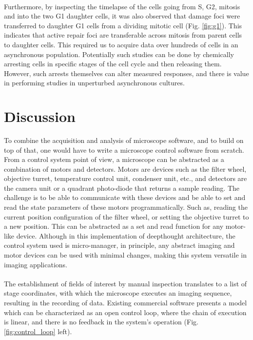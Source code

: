 \paragraph*{} Furthermore, by inspecting the timelapse of the cells going from S, G2, mitosis and into the two G1 daughter cells, it was also observed that damage foci were transferred to daughter G1 cells from a dividing mitotic cell (Fig. \ref{fig:g1}). This indicates that active repair foci are transferable across mitosis from parent cells to daughter cells. This required us to acquire data over hundreds of cells in an asynchronous population. Potentially such studies can be done by chemically arresting cells in specific stages of the cell cycle and then releasing them. However, such arrests themselves can alter measured responses, and there is value in performing studies in unperturbed asynchronous cultures.

\section{Discussion}
\paragraph*{} To combine the acquisition and analysis of microscope software, and to build on top of that, one would have to write a microscope control software from scratch. From a control system point of view, a microscope can be abstracted as a combination of motors and detectors. Motors are devices such as the filter wheel, objective turret, temperature control unit, condenser unit, etc., and detectors are the camera unit or a quadrant photo-diode that returns a sample reading. The challenge is to be able to communicate with these devices and be able to set and read the state parameters of these motors programmatically. Such as, reading the current position configuration of the filter wheel, or setting the objective turret to a new position. This can be abstracted as a set and read function for any motor-like device. Although in this implementation of deepthought architecture, the control system used is micro-manager, in principle, any abstract imaging and motor devices can be used with minimal changes, making this system versatile in imaging applications.

\paragraph*{} The establishment of fields of interest by manual inspection translates to a list of stage coordinates, with which the microscope executes an imaging sequence, resulting in the recording of data. Existing commercial software presents a model which can be characterized as an open control loop, where the chain of execution is linear, and there is no feedback in the system's operation (Fig. \ref{fig:control_loop} left).

